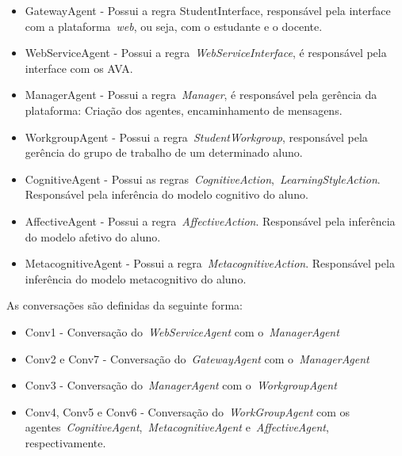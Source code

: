 \begin{itemize}
	\item GatewayAgent - Possui a regra StudentInterface, responsável pela interface com a plataforma~\emph{web}, ou seja, com o estudante e o docente.
	\item WebServiceAgent - Possui a regra~\emph{WebServiceInterface}, é responsável pela interface com os AVA.
	\item ManagerAgent - Possui a regra~\emph{Manager}, é responsável pela gerência da plataforma: Criação dos agentes, encaminhamento de mensagens.
	\item WorkgroupAgent - Possui a regra~\emph{StudentWorkgroup}, responsável pela gerência do grupo de trabalho de um determinado aluno.
	\item CognitiveAgent - Possui as regras~\emph{CognitiveAction},~\emph{LearningStyleAction}. Responsável pela inferência do modelo cognitivo do aluno.
	\item AffectiveAgent - Possui a regra~\emph{AffectiveAction}. Responsável pela inferência do modelo afetivo do aluno.
	\item MetacognitiveAgent - Possui a regra~\emph{MetacognitiveAction}. Responsável pela inferência do modelo metacognitivo do aluno.
\end{itemize}

As conversações são definidas da seguinte forma:
\begin{itemize}
	\item Conv1 - Conversação do~\emph{WebServiceAgent} com o~\emph{ManagerAgent}
	\item Conv2 e Conv7 - Conversação do~\emph{GatewayAgent} com o~\emph{ManagerAgent}
	\item Conv3 - Conversação do~\emph{ManagerAgent} com o~\emph{WorkgroupAgent}
	\item Conv4, Conv5 e Conv6 - Conversação do~\emph{WorkGroupAgent} com os agentes~\emph{CognitiveAgent},~\emph{MetacognitiveAgent} e~\emph{AffectiveAgent}, respectivamente.
\end{itemize}

